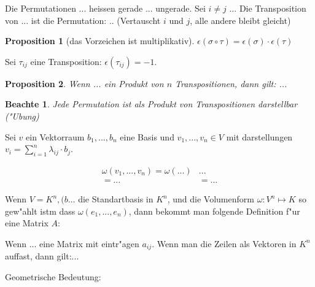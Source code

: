 \documentclass[11pt]{article}
\newtheorem*{notte}{Beachte}
\newtheorem*{proposition}{Proposition}
\begin{document}
\begin{definition}
  Die Permutationen ... heissen gerade ... ungerade.
  Sei $i\not=j$ ... Die Transposition von ... ist die Permutation: ..
  (Vertauscht $i$ und $j$, alle andere bleibt gleicht)
\end{definition}


\begin{proposition}[das Vorzeichen ist multiplikativ]
  $\epsilon(\sigma\circ \tau)= \epsilon (\sigma) \cdot \epsilon (\tau)$
\end{proposition}


\begin{relation}
  Sei $\tau_{ij}$ eine Transposition: $\epsilon(\tau_{ij})=-1$.
\end{relation}

\begin{proposition}
  Wenn ... ein Produkt von $n$ Transpositionen, dann gilt: ...
\end{proposition}

\begin{notte}
  Jede Permutation ist als Produkt von Transpositionen darstellbar ("Ubung)
\end{notte}

\begin{trivlist}
\item Sei $v$ ein Vektorraum $b_1, ..., b_n$ eine Basis und $v_1, ..., v_n \in
  V$ mit darstellungen $v_i = \sum_{i=1}^n{\lambda_{ij}\cdot b_j}$.
  
\item
  \begin{align*}
    \omega(v_1,...,v_n) = \omega (...) &  ... \\
    = ... & = ... 
   \end{align*}
 \end{trivlist}

 Wenn $V=K^n, (b...$ die Standartbasis in $K^n$, und die Volumenform $\omega:
 V^n\mapsto K$ so gew"ahlt istm dass $\omega(e_1,...,e_n)$, dann bekommt man
 folgende Definition f"ur eine Matrix $A$:

 \begin{definition}
   Wenn ... eine Matrix mit eintr"agen $a_{ij}$. Wenn man die Zeilen als
   Vektoren in $K^n$ auffast, dann gilt:...
 \end{definition}

 \begin{relation}
   Geometrische Bedeutung: 
 \end{relation}
\end{document}
